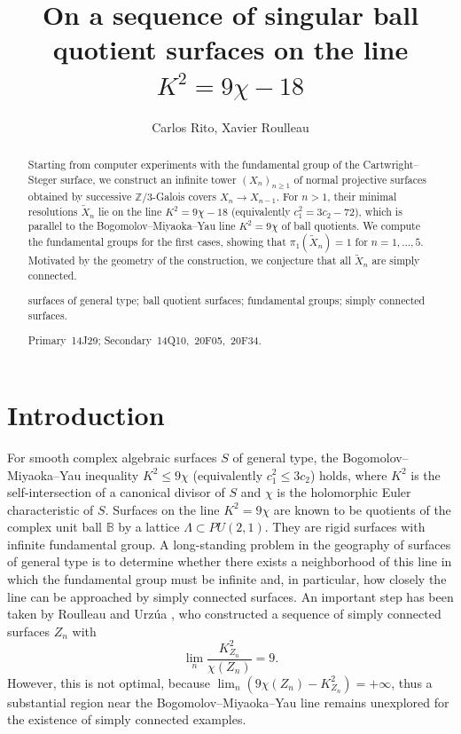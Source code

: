 \documentclass[10pt,a4paper]{article}
\title{On a sequence of singular ball quotient surfaces on the line $K^2=9\chi-18$}
\author{Carlos Rito, Xavier Roulleau}
\date{}
\newcommand{\ZZ}{\mathbb{Z}}
\begin{document}
\maketitle

\begin{abstract}
Starting from computer experiments with the fundamental group of the Cartwright–Steger surface,
we construct an infinite tower \((X_n)_{n\ge1}\) of normal projective surfaces obtained
by successive \(\ZZ/3\)-Galois covers \mbox{\(X_{n} \to X_{n-1}\)}.
For $n>1$, their minimal resolutions \(\widetilde{X}_n\) lie on the line \(K^2 = 9\chi - 18\)
(equivalently \(c_1^2 = 3c_2 - 72\)), which is parallel to the Bogomolov--Miyaoka--Yau line
\(K^2 = 9\chi\) of ball quotients. We compute the fundamental groups for the first cases,
showing that \(\pi_1(\widetilde{X}_n)=1\) for $n=1,\ldots,5$.
Motivated by the geometry of the construction, we conjecture that all \(\widetilde{X}_n\) are simply connected.
\medskip

surfaces of general type; ball quotient surfaces; fundamental groups; simply connected surfaces.

\medskip

Primary~14J29; Secondary~14Q10,~20F05,~20F34.
\end{abstract}





\section{Introduction}

For smooth complex algebraic surfaces $S$ of general type, the Bogomolov--Miyaoka--Yau inequality $K^2\leq 9\chi$
(equivalently $c_1^2\leq 3c_2$) holds, where $K^2$ is the self-intersection of a canonical divisor of $S$
and $\chi$ is the holomorphic Euler characteristic of $S.$ Surfaces on the line $K^2=9\chi$ are known to be
quotients of the complex unit ball $\mathbb B$ by a lattice $\Lambda\subset PU(2,1).$
They are rigid surfaces with infinite fundamental group.
A long-standing problem in the geography of surfaces of general type is to determine whether there exists a
neighborhood of this line in which the fundamental group must be infinite and, in particular,
how closely the line can be approached by simply connected surfaces.
An important step has been taken by Roulleau and Urz\'ua \cite{RU},
who constructed a sequence of simply connected surfaces $Z_n$ with 
\[ \lim_{n}\frac{K_{Z_n}^2}{\chi(Z_n)}=9.\]
However, this is not optimal, because $\lim_{n} \left(9\chi(Z_n)-K_{Z_n}^2\right)=+\infty$,
thus a substantial region near the Bogomolov--Miyaoka--Yau line remains unexplored for the existence of
simply connected examples.
\end{document}
